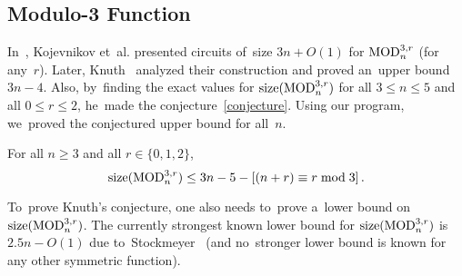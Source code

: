 \subsection{Modulo-3 Function}
In~\cite{DBLP:conf/sat/KojevnikovKY09}, Kojevnikov et~al.
presented circuits of~size $3n+O(1)$ for $\operatorname{MOD}_n^{3,r}$ (for any~$r$). Later,
Knuth~\cite[solution to exercise~$480$]{Knuth:2015:ACP:2898950} analyzed their construction and proved an~upper
bound $3n-4$. Also, by~finding the exact values
for $\operatorname{size}(\operatorname{MOD}_n^{3,r})$ for all $3 \le n \le 5$ and all $0 \le r \le 2$, he~made the conjecture~\eqref{conjecture}.
Using our program, we~proved the conjectured upper bound for all~$n$.

\begin{theorem}\label{theorem:mod3upper}
For all $n \ge 3$ and all $r \in \{0,1,2\}$,
\[\operatorname{size}(\operatorname{MOD}_n^{3,r}) \le 3n-5-[(n+r) \equiv r\bmod 3] \,. \]
\end{theorem}

To~prove Knuth's conjecture, one also needs to~prove a~lower bound on $\operatorname{size}(\operatorname{MOD}_n^{3,r})$. The currently strongest known lower bound for $\operatorname{size}(\operatorname{MOD}_n^{3,r})$
is~$2.5n-O(1)$ due to~Stockmeyer~\cite{DBLP:journals/mst/Stockmeyer77}
(and no~stronger lower bound is known for any other symmetric function).

